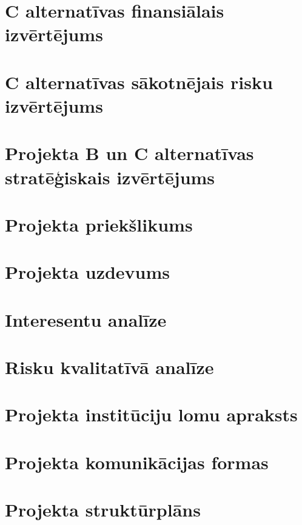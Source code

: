 \section{C alternatīvas finansiālais izvērtējums}
	\label{app:C_finansialais_vertejums}
    \clearpage

\section{C alternatīvas sākotnējais risku izvērtējums}
	\label{app:C_sakotnejie_riski}
    \clearpage
\section{Projekta B un C alternatīvas stratēģiskais izvērtējums}
	\label{app:B_C_strategiskais_vertejums}
    \clearpage
\section{Projekta priekšlikums}
	\label{app:Projekta_priekslikums}
    \clearpage
\section{Projekta uzdevums}
	\label{app:Projekta_uzdevums}
    \clearpage
\section{Interesentu analīze}
	\label{app:Projekta_interesentu_analize}
    \clearpage
\section{Risku kvalitatīvā analīze}
	\label{app:Projekta_risku_analize}
    \clearpage
\section{Projekta institūciju lomu apraksts}
	\label{app:Projekta_instituciju_apraksts}
    \clearpage
\section{Projekta komunikācijas formas}
	\label{app:Projekta_komunikacijas_formas}
    \clearpage
\section{Projekta struktūrplāns}
    \begin{figure}
        \centering 
        
    \end{figure}
    \label{app:Projekta_strukturplans}
    \clearpage
